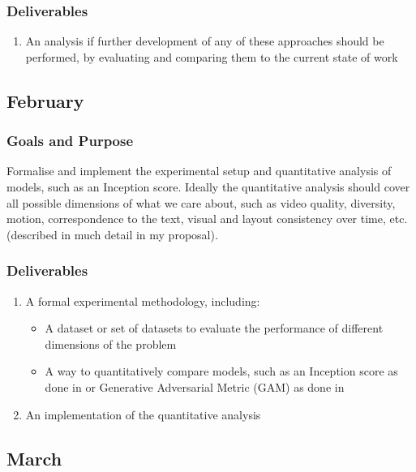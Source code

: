 \documentclass{article}
\begin{document}
{{\subsubsection{Deliverables}

\begin{enumerate}
    \item An analysis if further development of any of these approaches should be performed, by evaluating and comparing them to the current state of work
\end{enumerate}

\subsection{February}

\subsubsection{Goals and Purpose}

Formalise and implement the experimental setup and quantitative analysis of models, such as an Inception score. Ideally the quantitative analysis should cover all possible
dimensions of what we care about, such as video quality, diversity, motion, correspondence to the text, visual and layout consistency over time, etc. (described in much detail in my proposal).

\subsubsection{Deliverables}

\begin{enumerate}
    \item A formal experimental methodology, including: 
        \begin{itemize}
            \item A dataset or set of datasets to evaluate the performance of different dimensions of the problem
            \item A way to quantitatively compare models, such as an Inception score as done in \cite{zhang_stackgan++:_2017} or Generative Adversarial Metric (GAM) as done in \cite{pan_create_2018}
        \end{itemize}
    \item An implementation of the quantitative analysis
\end{enumerate}

\subsection{March}

}}
\end{document}
